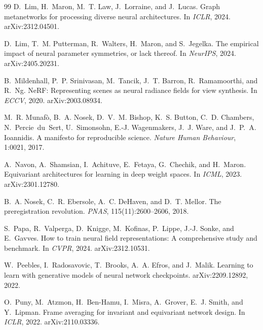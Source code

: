 \documentclass[10pt,letterpaper]{article}
\theoremstyle{definition}
\begin{document}
\begin{thebibliography}{99}
D.~Lim, H.~Maron, M.~T. Law, J.~Lorraine, and J.~Lucas.
\newblock Graph metanetworks for processing diverse neural architectures.
\newblock In \emph{ICLR}, 2024. arXiv:2312.04501.

D.~Lim, T.~M. Putterman, R.~Walters, H.~Maron, and S.~Jegelka.
\newblock The empirical impact of neural parameter symmetries, or lack thereof.
\newblock In \emph{NeurIPS}, 2024. arXiv:2405.20231.

B.~Mildenhall, P.~P. Srinivasan, M.~Tancik, J.~T. Barron, R.~Ramamoorthi, and R.~Ng.
\newblock NeRF: Representing scenes as neural radiance fields for view synthesis.
\newblock In \emph{ECCV}, 2020. arXiv:2003.08934.

M.~R. Munaf\`o, B.~A. Nosek, D.~V.~M. Bishop, K.~S. Button, C.~D. Chambers, N.~Percie~du~Sert,
U.~Simonsohn, E.-J. Wagenmakers, J.~J. Ware, and J.~P.~A. Ioannidis.
\newblock A manifesto for reproducible science.
\newblock \emph{Nature Human Behaviour}, 1:0021, 2017.

A.~Navon, A.~Shamsian, I.~Achituve, E.~Fetaya, G.~Chechik, and H.~Maron.
\newblock Equivariant architectures for learning in deep weight spaces.
\newblock In \emph{ICML}, 2023. arXiv:2301.12780.

B.~A. Nosek, C.~R. Ebersole, A.~C. DeHaven, and D.~T. Mellor.
\newblock The preregistration revolution.
\newblock \emph{PNAS}, 115(11):2600--2606, 2018.

S.~Papa, R.~Valperga, D.~Knigge, M.~Kofinas, P.~Lippe, J.-J. Sonke, and E.~Gavves.
\newblock How to train neural field representations: A comprehensive study and benchmark.
\newblock In \emph{CVPR}, 2024. arXiv:2312.10531.

W.~Peebles, I.~Radosavovic, T.~Brooks, A.~A. Efros, and J.~Malik.
\newblock Learning to learn with generative models of neural network checkpoints.
\newblock arXiv:2209.12892, 2022.

O.~Puny, M.~Atzmon, H.~Ben-Hamu, I.~Misra, A.~Grover, E.~J. Smith, and Y.~Lipman.
\newblock Frame averaging for invariant and equivariant network design.
\newblock In \emph{ICLR}, 2022. arXiv:2110.03336.


\end{thebibliography}
\end{document}
